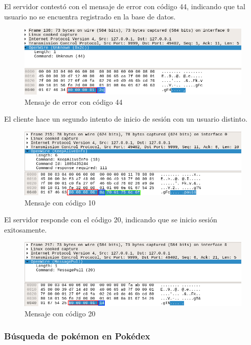 \documentclass[12pt]{article}
\begin{document}
El servidor contestó con el mensaje de error con código 44, indicando que tal usuario no se encuentra registrado en la base de datos.
\begin{figure}[H]
  \centering
  \includegraphics[width=\textwidth]{04}
  \caption{Mensaje de error con código 44}
\end{figure}

El cliente hace un segundo intento de inicio de sesión con un usuario distinto.

\begin{figure}[H]
  \centering
  \includegraphics[width=\textwidth]{05}
  \caption{Mensaje con código 10}
\end{figure}

El servidor responde con el código 20, indicando que se inicio sesión exitosamente.

\begin{figure}[H]
  \centering
  \includegraphics[width=\textwidth]{06}
  \caption{Mensaje con código 20}
\end{figure}

\subsubsection{Búsqueda de pokémon en Pokédex}
\end{document}
